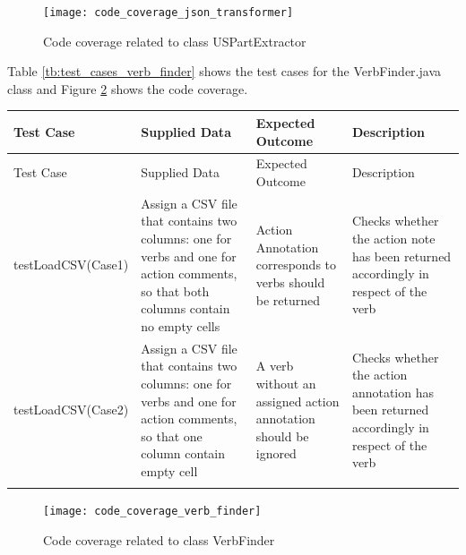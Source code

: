 \begin{figure}[h]
	\centering
	\texttt{[image: code\_coverage\_json\_transformer]}
	\caption{Code coverage related to class USPartExtractor}\label{fig:code_coverage_json_transformer}
\end{figure} 


Table \ref{tb:test_cases_verb_finder} shows the test cases for the VerbFinder.java class and Figure \ref{fig:code_coverage_verb_finder} shows the code coverage.

	\thispagestyle{empty}
		\begingroup
		\centering
		\scriptsize
		\renewcommand{\arraystretch}{1,5} 
		\keepXColumns
		\begin{tabularx}{\textwidth}{X  X  X  X}		
			\hline
			Test Case &Supplied Data&Expected Outcome&Description\\
			\hline\hline
			\endfirsthead
			\hline
			Test Case &Supplied Data&Expected Outcome&Description\\
			\hline\hline
			\endhead
			testLoadCSV\linebreak (Case1)&Assign a CSV file that contains two columns: one for verbs and one for action comments, so that both columns contain no empty cells&Action Annotation corresponds to verbs should be returned&Checks whether the action note has been returned accordingly in respect of the verb\\
			
			testLoadCSV\linebreak (Case2)&Assign a CSV file that contains two columns: one for verbs and one for action comments, so that one column contain empty cell&A verb without an assigned action annotation should be ignored&Checks whether the action annotation has been returned accordingly in respect of the verb\\
			\hline
				\caption{Test cases for VerbFinder class}\label{tb:test_cases_verb_finder}
		\end{tabularx}		
		\endgroup

\begin{figure}[h]
	\centering
	\texttt{[image: code\_coverage\_verb\_finder]}
	\caption{Code coverage related to class VerbFinder}\label{fig:code_coverage_verb_finder}
\end{figure} 

